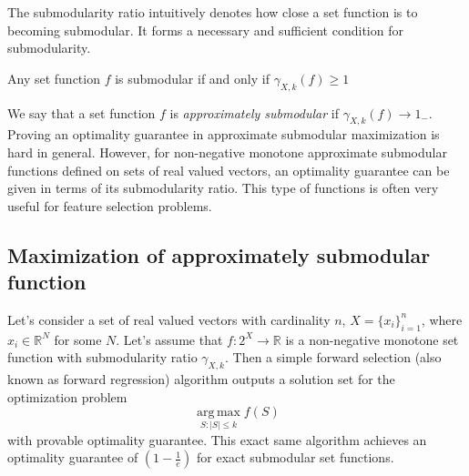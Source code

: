 \noindent The submodularity ratio intuitively denotes how close a set function is to becoming submodular. It forms a necessary and sufficient condition for submodularity.

\begin{lemma}
 Any set function $f$ is submodular if and only if $\gamma_{X,k}(f)\ge 1$
\end{lemma}

\noindent We say that a set function $f$ is \emph{approximately submodular} if $\gamma_{X,k}(f)\rightarrow 1_-$. Proving an optimality guarantee in approximate submodular maximization is hard in general. However, for non-negative monotone approximate submodular functions defined on sets of real valued vectors, an optimality guarantee can be given in terms of its submodularity ratio. This type of functions is often very useful for feature selection problems.

\subsection{Maximization of approximately submodular function}
\label{subsection:approxmax}
Let's consider a set of real valued vectors with cardinality $n$, $X=\{x_i\}_{i=1}^n$, where $x_i\in \mathbb{R}^N$ for some $N$. Let's assume that $f:2^X\rightarrow \mathbb{R}$ is a non-negative monotone set function with submodularity ratio $\gamma_{X,k}$. Then a simple forward selection (also known as forward regression) algorithm outputs a solution set for the optimization problem
\[
 \operatorname*{arg\,max}_{S:|S|\le k} f(S)
\]
with provable optimality guarantee. This exact same algorithm achieves an optimality guarantee of $(1-\frac{1}{e})$ for exact submodular set functions. 

